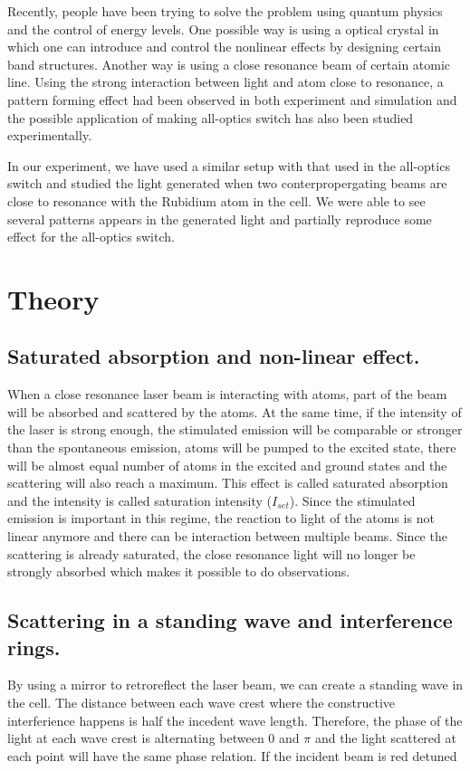\documentclass[aps,twocolumn,secnumarabic,balancelastpage,amsmath,amssymb,nofootinbib]{revtex4}
\begin{document}
Recently, people have been trying to solve the problem using quantum physics and the control of energy levels. One possible way is using a optical crystal in which one can introduce and control the nonlinear effects by designing certain band structures. Another way is using a close resonance beam of certain atomic line. Using the strong interaction between light and atom close to resonance, a pattern forming effect had been observed in both experiment\cite{rb_exp} and simulation\cite{rb_sim} and the possible application of making all-optics switch has also been studied experimentally\cite{rb_switch}.

In our experiment, we have used a similar setup with that used in the all-optics switch\cite{rb_switch} and studied the light generated when two conterpropergating beams are close to resonance with the Rubidium atom in the cell. We were able to see several patterns appears in the generated light and partially reproduce some effect for the all-optics switch.

\section{Theory}
\subsection{Saturated absorption and non-linear effect.}
When a close resonance laser beam is interacting with atoms, part of the beam will be absorbed and scattered by the atoms. At the same time, if the intensity of the laser is strong enough, the stimulated emission will be comparable or stronger than the spontaneous emission, atoms will be pumped to the excited state, there will be almost equal number of atoms in the excited and ground states and the scattering will also reach a maximum. This effect is called saturated absorption and the intensity is called saturation intensity ($I_{set}$). Since the stimulated emission is important in this regime, the reaction to light of the atoms is not linear anymore and there can be interaction between multiple beams. Since the scattering is already saturated, the close resonance light will no longer be strongly absorbed which makes it possible to do observations.

\subsection{Scattering in a standing wave and interference rings.}
By using a mirror to retroreflect the laser beam, we can create a standing wave in the cell. The distance between each wave crest where the constructive interferience happens is half the incedent wave length. Therefore, the phase of the light at each wave crest is alternating between $0$ and $\pi$ and the light scattered at each point will have the same phase relation. If the incident beam is red detuned
\end{document}

